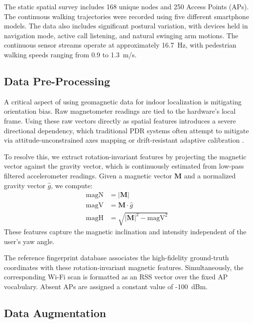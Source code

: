 \documentclass[conference]{IEEEtran}
\begin{document}
The static spatial survey includes 168 unique nodes and 250 Access Points (APs). The continuous walking trajectories were recorded using five different smartphone models. The data also includes significant postural variation, with devices held in navigation mode, active call listening, and natural swinging arm motions. The continuous sensor streams operate at approximately 16.7~Hz, with pedestrian walking speeds ranging from 0.9 to 1.3~m/s.

\subsection{Data Pre-Processing}\label{sec:preprocessing}

A critical aspect of using geomagnetic data for indoor localization is mitigating orientation bias. Raw magnetometer readings are tied to the hardware's local frame. Using these raw vectors directly as spatial features introduces a severe directional dependency, which traditional PDR systems often attempt to mitigate via attitude-unconstrained axes mapping \cite{axesmapping} or drift-resistant adaptive calibration \cite{driftresistant}.

To resolve this, we extract rotation-invariant features by projecting the magnetic vector against the gravity vector, which is continuously estimated from low-pass filtered accelerometer readings. Given a magnetic vector $\mathbf{M}$ and a normalized gravity vector $\hat{g}$, we compute:
\begin{align}
\text{magN} &= |\mathbf{M}| \label{eq:magn}\\
\text{magV} &= \mathbf{M} \cdot \hat{g} \label{eq:magv}\\
\text{magH} &= \sqrt{|\mathbf{M}|^2 - \text{magV}^2} \label{eq:magh}
\end{align}
These features capture the magnetic inclination and intensity independent of the user's yaw angle. 

The reference fingerprint database associates the high-fidelity ground-truth coordinates with these rotation-invariant magnetic features. Simultaneously, the corresponding Wi-Fi scan is formatted as an RSS vector over the fixed AP vocabulary. Absent APs are assigned a constant value of -100~dBm.

\subsection{Data Augmentation}\label{sec:synth_traj}
\end{document}

